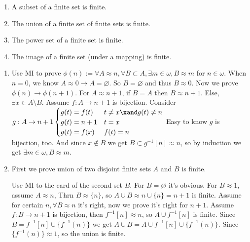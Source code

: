 \documentclass{ctexart}
\begin{document}
\begin{problem}
 \begin{enumerate}[ref=\theproblem.\arabic*]
  \item\label{it:2.1} A subset of a finite set is finite.
  \item\label{it:2.2} The union of a finite set of finite sets is finite.
  \item The power set of a finite set is finite.
  \item The image of a finite set (under a mapping) is finite.
 \end{enumerate}
\end{problem}

\begin{solution}
 \begin{enumerate}
  \item Use MI to prove $\phi(n):=\forall A\approx n,\forall B\subset A,\exists m\in \omega,B\approx m$ for $n\in \omega$. When $n=0$, we know $A\approx 0\to A=\varnothing$. So $B=\varnothing$ and thus $B\approx 0$. Now we prove $\phi(n)\to \phi(n+1)$. For $A\approx n+1$, if $B=A$ then $B\approx n+1$. Else, $\exists x\in A\setminus B$. Assume $f:A\to n+1$ is bijection. Consider $g:A\to n+1
  \begin{cases}
   g(t)=f(t) & t\neq x\xand g(t)\neq n\\
   g(t)=n+1  &t=x\\
   g(t)=f(x) &f(t)=n
  \end{cases}$
  Easy to know $g$ is bijection, too. And since $x\notin B$ we get $B\subset g^{-1}[n]\approx n$, so by induction we get $\exists m\in \omega,B\approx m$. 
  \item First we prove union of two disjoint finite sets $A$ and $B$ is finite. 
  
  Use MI to the card of the second set $B$. For $B=\varnothing$ it's obvious. For $B\approx 1$, assume $A\approx n$, Thrn $B\approx \{n\}$, so $A\cup B\approx n\cup\{n\}=n+1$ is finite. Assume for certain $n,\forall B\approx n$ it's right, now we prove it's right for $n+1$. Assume $f:B\to n+1$ is bijection, then $f^{-1}[n]\approx n$, so $A\cup f^{-1}[n]$ is finite. Since $B=f^{-1}[n]\cup\{f^{-1}(n)\}$ we get $A\cup B=A\cup f^{-1}[n]\cup\{f^{-1}(n)\}$. Since $\{f^{-1}(n)\}\approx 1$, so the union is finite. 


\end{enumerate}
\end{solution}
\end{document}
